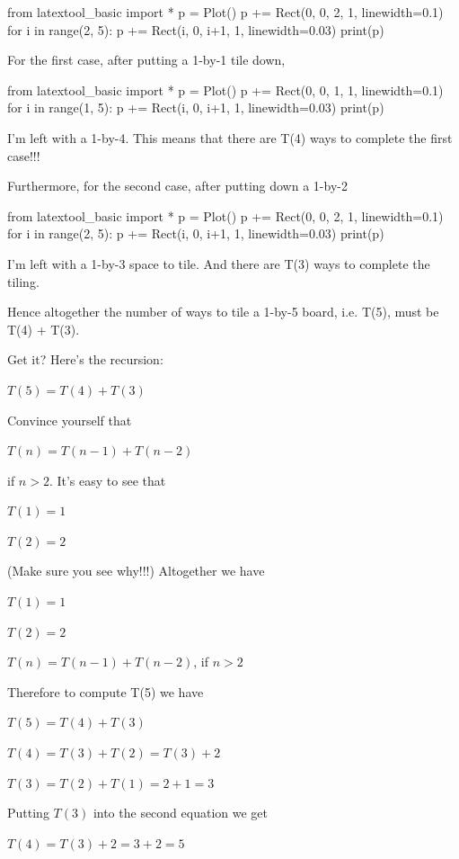 \begin{python}
from latextool_basic import *
p = Plot()
p += Rect(0, 0, 2, 1, linewidth=0.1)
for i in range(2, 5):
    p += Rect(i, 0, i+1, 1, linewidth=0.03)
print(p)
\end{python}

For the first case, after putting a 1-by-1 tile down,
\begin{python}
from latextool_basic import *
p = Plot()
p += Rect(0, 0, 1, 1, linewidth=0.1)
for i in range(1, 5):
    p += Rect(i, 0, i+1, 1, linewidth=0.03)
print(p)
\end{python}

I'm left with a 1-by-4. This means that there are T(4)
ways to complete the first case!!!

Furthermore, for the second case, after putting down a 1-by-2

\begin{python}
from latextool_basic import *
p = Plot()
p += Rect(0, 0, 2, 1, linewidth=0.1)
for i in range(2, 5):
    p += Rect(i, 0, i+1, 1, linewidth=0.03)
print(p)
\end{python}

I'm left with a 1-by-3 space to tile. And there are T(3)
ways to complete the tiling.

Hence altogether the number of ways to tile a 1-by-5 board, i.e. T(5),
must be T(4) + T(3).

Get it? Here's the recursion:

$T(5) = T(4) + T(3)$

Convince yourself that

$T(n) = T(n - 1) + T(n - 2)$

if $n > 2$. It's easy to see that

$T(1) = 1$

$T(2) = 2$

(Make sure you see why!!!) Altogether we have

$T(1) = 1$

$T(2) = 2$

$T(n) = T(n - 1) + T(n - 2)$, if $n > 2$

Therefore to compute T(5) we have

$T(5) = T(4) + T(3)$

$T(4) = T(3) + T(2) = T(3) + 2$

$T(3) = T(2) + T(1) = 2 + 1 = 3$

Putting $T(3)$ into the second equation we get

$T(4) = T(3) + 2 = 3 + 2 = 5$

